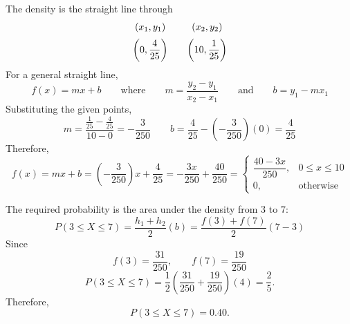 {		
		The density is the straight line through
		\[
		\begin{array}{c@{\qquad}c}
			(x_1,y_1) & (x_2,y_2) \\[2mm]
			\left(0,\dfrac{4}{25}\right)
			&
			\left(10,\dfrac{1}{25}\right)
		\end{array}
		\]
		For a general straight line,
		\[
		f(x)=mx+b
		\qquad
		\text{where}
		\qquad
		m=\frac{y_2-y_1}{x_2-x_1}
		\qquad\text{and}\qquad
		b=y_1-mx_1
		\]
		Substituting the given points,
		\[
		m=
		\frac{\frac1{25}-\frac4{25}}{10-0}
		=
		-\frac3{250}
		\qquad
		b=\frac4{25}-\left(-\frac3{250}\right)(0)
		=
		\frac4{25}
		\]
		Therefore,
		\[
		f(x) =mx+b =
		\left( -\frac3{250} \right) x+\frac4{25}
		=
		-\frac{3x}{250}+\frac{40}{250}
		=
		\begin{cases}
			\dfrac{40-3x}{250},&0\le x\le10\\[1mm]
			0,&\text{otherwise}
		\end{cases}
		\]
		
		The required probability is the area under the density from \(3\) to \(7\):
		\[
		P(3\le X\le7)
		=\frac{h_1+h_2}{2} (b) =
		\frac{
			f(3)+f(7)
		}{2}(7-3)		
		\]
		Since
		\[
		f(3)=\frac{31}{250},
		\qquad
		f(7)=\frac{19}{250}
		\]
		\[
		P(3\le X\le7)
		=
		\frac12
		\left(
		\frac{31}{250}+\frac{19}{250}
		\right)(4)
		=
		\frac25.
		\]
		Therefore,
		\[
		\boxed{P(3\le X\le7)=0.40}.
		\]
		
		
		\vspace{-5mm}
		
	}
	
